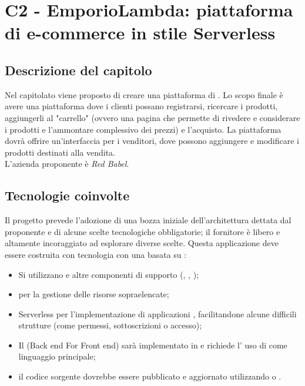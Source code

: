 \section{C2 - EmporioLambda: piattaforma di e-commerce in stile Serverless}

\subsection{Descrizione del capitolo}
Nel capitolato viene proposto di creare una piattaforma di .
Lo scopo finale è avere una piattaforma dove i clienti possano registrarsi, ricercare i prodotti, aggiungerli al "carrello" (ovvero una pagina che permette di rivedere e considerare i prodotti e l'ammontare complessivo dei prezzi) e l'acquisto. La piattaforma dovrà offrire un'interfaccia per i venditori, dove possono aggiungere e modificare i prodotti destinati alla vendita.\\
L'azienda proponente è \textit{Red Babel}.

\subsection{Tecnologie coinvolte}
Il progetto prevede l'adozione di una bozza iniziale dell'architettura dettata dal proponente e di alcune scelte tecnologiche obbligatorie; il fornitore è libero e altamente incoraggiato ad esplorare diverse scelte.
Questa applicazione deve essere costruita con tecnologia  con una  basata su :
\begin{itemize}
\item	Si utilizzano  e altre componenti di supporto (, , );
\item	{} per la gestione delle risorse sopraelencate;
\item	Serverless  per l'implementazione di applicazioni , facilitandone alcune difficili strutture (come permessi, sottoscrizioni o accesso);
\item	Il (Back end For Front end) sarà implementato in  e richiede l' uso di  come linguaggio principale;
\item	il codice sorgente dovrebbe essere pubblicato e aggiornato utilizzando  o .
\end{itemize}

